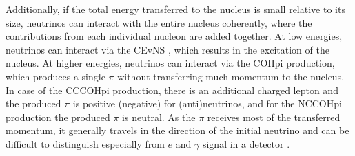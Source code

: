 




Additionally, if the total energy transferred to the nucleus is small relative to its size, neutrinos can interact with the entire nucleus coherently, where the contributions from each individual nucleon are added together. At low energies, neutrinos can interact via the \gls{CEvNS} \cite{CEvENSFirstObservation2017.pdf}, which results in the excitation of the nucleus. At higher energies, neutrinos can interact via the \gls{COHpi} production, which produces a single $\pi$ without transferring much momentum to the nucleus. In case of the \gls{CC}\gls{COHpi} production, there is an additional charged lepton and the produced $\pi$ is positive (negative) for (anti)neutrinos, and for the \gls{NC}\gls{COHpi} production the produced $\pi$ is neutral. As the $\pi$ receives most of the transferred momentum, it generally travels in the direction of the initial neutrino and can be difficult to distinguish especially from $e$ and $\gamma$ signal in a detector \cite{NeutrinoIntOverview2022.pdf}.

